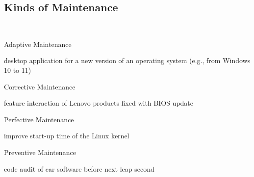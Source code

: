 \subsection{Kinds of Maintenance}
\begin{frame}{\myframetitle\ \mytitlesource{\ludewiglichter}}
	\begin{fancycolumns}
		\begin{definition}{Adaptive Maintenance \mysource{\lientzswanson}}
			 \hfill {}
		\end{definition}
		\begin{example}{}
			desktop application for a new version of an operating system (e.g., from Windows 10 to 11)
		\end{example}
		\begin{definition}{Corrective Maintenance \mysource{\lientzswanson}}
			 \hfill {}
		\end{definition}
		\begin{example}{}
			feature interaction of Lenovo products fixed with BIOS update
		\end{example}
	\nextcolumn
		\begin{definition}{Perfective Maintenance \mysource{\lientzswanson}}
			 \hfill {}
		\end{definition}
		\begin{example}{}
			improve start-up time of the Linux kernel
		\end{example}
		\begin{definition}{Preventive Maintenance \mysource{\lientzswanson}}
			 \hfill {}
		\end{definition}
		\begin{example}{}
			code audit of car software before next leap second
		\end{example}
	\end{fancycolumns}
\end{frame}

